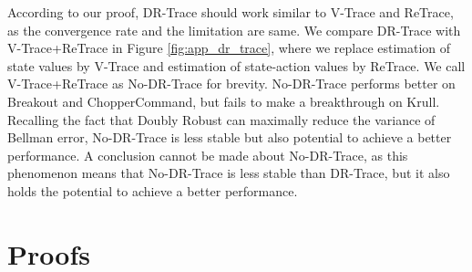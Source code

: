 According to our proof, DR-Trace should work similar to V-Trace and ReTrace, as the convergence rate and the limitation are same. 
We compare DR-Trace with V-Trace+ReTrace in Figure \ref{fig:app_dr_trace}, where we replace estimation of state values by V-Trace and estimation of state-action values by ReTrace. 
We call V-Trace+ReTrace as No-DR-Trace for brevity. 
No-DR-Trace performs better on Breakout and ChopperCommand, but fails to make a breakthrough on Krull. 
Recalling the fact that Doubly Robust can maximally reduce the variance of Bellman error, No-DR-Trace is less stable but also potential to achieve a better performance. 
A conclusion cannot be made about No-DR-Trace, as this phenomenon means that No-DR-Trace is less stable than DR-Trace, but it also holds the potential to achieve a better performance.



\section{Proofs}
\label{app:proof}

\theoremstyle{plain}
\newtheorem{Lemma_app}{Lemma}[section]
\newtheorem{Theorem_app}{Theorem}[section]
\theoremstyle{definition}
\newtheorem*{Remark_app}{Remark}
\theoremstyle{remark}






